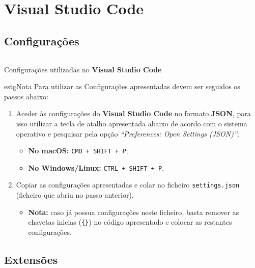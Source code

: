 \section*{\textbf{Visual Studio Code}}
\label{vscodeConfigs}

\subsection*{Configurações}

\begin{longlisting}
	\inputminted{json}{code/vscode-settings.json}
	\caption{Configurações utilizadas no \textbf{Visual Studio Code}}
\end{longlisting}

\begin{mybox}{estg}{Nota}
	Para utilizar as Configurações apresentadas devem ser seguidos os passos abaixo:

	\begin{enumerate}
		\item Aceder às configurações do \textbf{Visual Studio Code} no formato \textbf{JSON}, para isso utilizar a tecla de atalho apresentada abaixo de acordo com o sistema operativo e pesquisar pela opção \textit{``Preferences: Open Settings (JSON)''};
		\begin{itemize}
			\item \textbf{No macOS:} \texttt{CMD + SHIFT + P};
			\item \textbf{No Windows/Linux:} \texttt{CTRL + SHIFT + P}.
		\end{itemize}
		\item Copiar as configurações apresentadas e colar no ficheiro \texttt{settings.json} (ficheiro que abriu no passo anterior).
		\begin{itemize}
			\item \textbf{Nota:} caso já possua configurações neste ficheiro, basta remover as chavetas inicias (\verb|{}|) no código apresentado e colocar as restantes configurações.
		\end{itemize}
	\end{enumerate}
\end{mybox}

\subsection*{Extensões}

